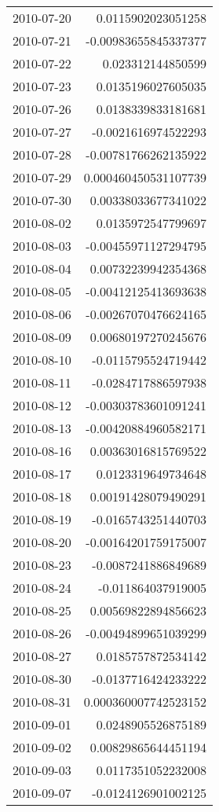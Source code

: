 \begin{tabular}{l | r}
2010-07-20 & 0.0115902023051258 \\
2010-07-21 & -0.00983655845337377 \\
2010-07-22 & 0.023312144850599 \\
2010-07-23 & 0.0135196027605035 \\
2010-07-26 & 0.0138339833181681 \\
2010-07-27 & -0.0021616974522293 \\
2010-07-28 & -0.00781766262135922 \\
2010-07-29 & 0.000460450531107739 \\
2010-07-30 & 0.00338033677341022 \\
2010-08-02 & 0.0135972547799697 \\
2010-08-03 & -0.00455971127294795 \\
2010-08-04 & 0.00732239942354368 \\
2010-08-05 & -0.00412125413693638 \\
2010-08-06 & -0.00267070476624165 \\
2010-08-09 & 0.00680197270245676 \\
2010-08-10 & -0.0115795524719442 \\
2010-08-11 & -0.0284717886597938 \\
2010-08-12 & -0.00303783601091241 \\
2010-08-13 & -0.00420884960582171 \\
2010-08-16 & 0.00363016815769522 \\
2010-08-17 & 0.0123319649734648 \\
2010-08-18 & 0.00191428079490291 \\
2010-08-19 & -0.0165743251440703 \\
2010-08-20 & -0.00164201759175007 \\
2010-08-23 & -0.0087241886849689 \\
2010-08-24 & -0.011864037919005 \\
2010-08-25 & 0.00569822894856623 \\
2010-08-26 & -0.00494899651039299 \\
2010-08-27 & 0.0185757872534142 \\
2010-08-30 & -0.0137716424233222 \\
2010-08-31 & 0.000360007742523152 \\
2010-09-01 & 0.0248905526875189 \\
2010-09-02 & 0.00829865644451194 \\
2010-09-03 & 0.0117351052232008 \\
2010-09-07 & -0.0124126901002125 \\

\end{tabular}
